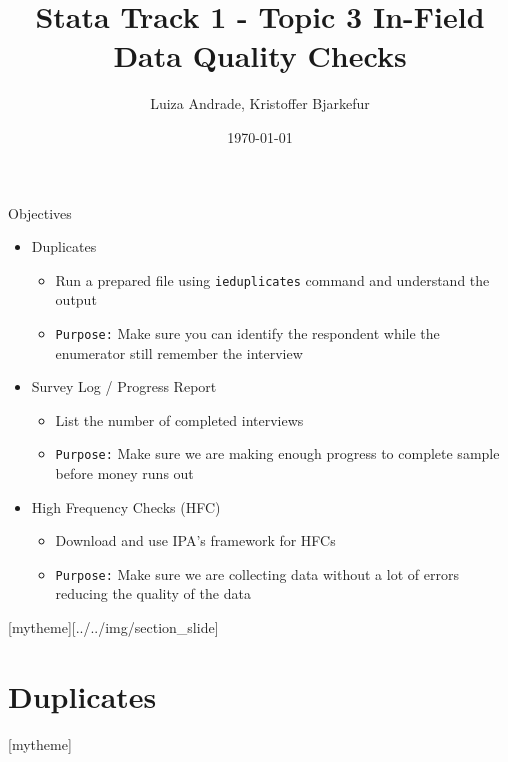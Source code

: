 \documentclass[aspectratio=169]{beamer}
\title{Stata Track 1 - Topic 3 \newline In-Field Data Quality Checks}
\date{\today}
\author{Luiza Andrade, Kristoffer Bjarkefur} %
\institute{Development Impact Evaluation (DIME) \newline The World Bank }
\newcommand{\sectionpic}[2]{
	\setbeamertemplate{section page}[mytheme][#2]
	\section{#1}
	\setbeamertemplate{section page}[mytheme]
}
\begin{document}
	{
		\maketitle
	}

\begin{frame}{Objectives}
	\begin{itemize}
		\item Duplicates
		\begin{itemize}
			\item Run a prepared file using \texttt{ieduplicates} command and understand the output
			\item \texttt{Purpose:} Make sure you can identify the respondent while the enumerator still remember the interview
		\end{itemize}
		\item Survey Log / Progress Report
		\begin{itemize}
			\item List the number of completed interviews
			\item \texttt{Purpose:} Make sure we are making enough progress to complete sample before money runs out
		\end{itemize}
		\item High Frequency Checks (HFC)
		\begin{itemize}
			\item Download and use IPA's framework for HFCs
			\item \texttt{Purpose:} Make sure we are collecting data without a lot of errors reducing the quality of the data
		\end{itemize}
	\end{itemize}
\end{frame}

\sectionpic{Duplicates}{../../img/section_slide}
\end{document}
